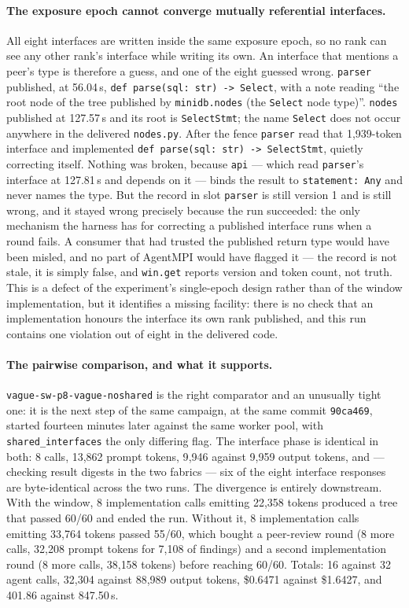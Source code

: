 \documentclass[11pt]{article}
\begin{document}
\paragraph{The exposure epoch cannot converge mutually referential interfaces.} All eight
interfaces are written inside the same exposure epoch, so no rank can see any other rank's
interface while writing its own. An interface that mentions a peer's type is therefore a guess,
and one of the eight guessed wrong. \texttt{parser} published, at 56.04\,s,
\texttt{def parse(sql: str) -> Select}, with a note reading ``the root node of the tree published
by \texttt{minidb.nodes} (the \texttt{Select} node type)''. \texttt{nodes} published at 127.57\,s
and its root is \texttt{SelectStmt}; the name \texttt{Select} does not occur anywhere in the
delivered \texttt{nodes.py}. After the fence \texttt{parser} read that 1{,}939-token interface and
implemented \texttt{def parse(sql: str) -> SelectStmt}, quietly correcting itself. Nothing was
broken, because \texttt{api} --- which read \texttt{parser}'s interface at 127.81\,s and depends
on it --- binds the result to \texttt{statement: Any} and never names the type. But the record in
slot \texttt{parser} is still version 1 and is still wrong, and it stayed wrong precisely because
the run succeeded: the only mechanism the harness has for correcting a published interface runs
when a round fails. A consumer that had trusted the published return type would have been
misled, and no part of AgentMPI would have flagged it --- the record is not stale, it is simply
false, and \texttt{win.get} reports version and token count, not truth. This is a defect of the
experiment's single-epoch design rather than of the window implementation, but it identifies a
missing facility: there is no check that an implementation honours the interface its own rank
published, and this run contains one violation out of eight in the delivered code.

\paragraph{The pairwise comparison, and what it supports.}
\texttt{vague-sw-p8-vague-noshared} is the right comparator and an unusually tight one: it is the
next step of the same campaign, at the same commit \texttt{90ca469}, started fourteen minutes
later against the same worker pool, with \texttt{shared\_interfaces} the only differing flag. The
interface phase is identical in both: 8 calls, 13{,}862 prompt tokens, 9{,}946 against 9{,}959
output tokens, and --- checking result digests in the two fabrics --- six of the eight interface
responses are byte-identical across the two runs. The divergence is entirely downstream. With the
window, 8 implementation calls emitting 22{,}358 tokens produced a tree that passed 60/60 and
ended the run. Without it, 8 implementation calls emitting 33{,}764 tokens passed 55/60, which
bought a peer-review round (8 more calls, 32{,}208 prompt tokens for 7{,}108 of findings) and a
second implementation round (8 more calls, 38{,}158 tokens) before reaching 60/60. Totals: 16
against 32 agent calls,
32{,}304 against 88{,}989 output tokens, \$0.6471 against \$1.6427, and 401.86 against 847.50\,s.
\end{document}

